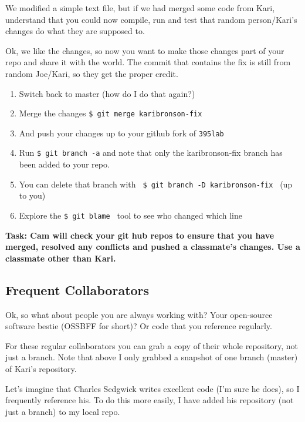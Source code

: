 \documentclass[letterpaper]{article}
\begin{document}
We modified a simple text file, but if we had merged some code from Kari, understand that you could now compile, run and test that random person/Kari's changes do what they are supposed to.  

Ok, we like the changes, so now you want to make those changes part of your
repo and share it with the world.  The commit that contains the fix is still
from random Joe/Kari, so they get the proper credit.

\begin{enumerate}
\item Switch back to master (how do I do that again?)
\item Merge the changes \verb+$ git merge karibronson-fix +
\item And push your changes up to your github fork of {\tt 395lab}
\item Run \verb+$ git branch -a+ and note that only the karibronson-fix branch has been added to your repo.
\item You can delete that branch with \verb+ $ git branch -D karibronson-fix + (up to you)
\item Explore the \verb+$ git blame + tool to see who changed which line
\end{enumerate}

\noindent
{\bf Task: Cam will check your git hub repos to ensure that you have merged, resolved any conflicts and pushed a classmate's changes.  Use a classmate other than Kari.}

\subsection*{Frequent Collaborators}

Ok, so what about people you are always working with?  Your open-source software bestie (OSSBFF for short)? Or code that you reference regularly.

For these regular collaborators you can grab a copy of their whole repository,
not just a branch.  Note that above I only grabbed a snapshot of one branch
(master) of Kari's repository. 

Let's imagine that Charles Sedgwick writes excellent code (I'm sure he does), so I frequently reference
his.  To do this more easily, I have added his repository (not just a branch)
to my local repo.
\end{document}
